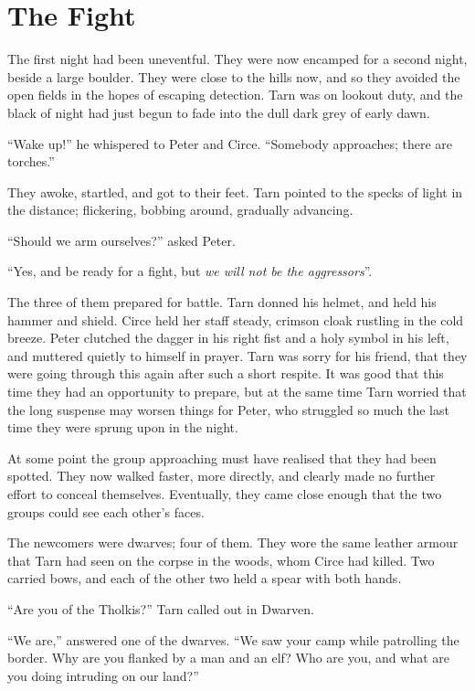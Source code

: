 \chapter{The Fight}

The first night had been uneventful.  They were now encamped for a second night, beside a large boulder.  They were close to the hills now, and so they avoided the open fields in the hopes of escaping detection.  Tarn was on lookout duty, and the black of night had just begun to fade into the dull dark grey of early dawn.

``Wake up!'' he whispered to Peter and Circe.  ``Somebody approaches; there are torches.''

They awoke, startled, and got to their feet.  Tarn pointed to the specks of light in the distance; flickering, bobbing around, gradually advancing.

``Should we arm ourselves?'' asked Peter.

``Yes, and be ready for a fight, but \emph{we will not be the aggressors}''.

The three of them prepared for battle.  Tarn donned his helmet, and held his hammer and shield.  Circe held her staff steady, crimson cloak rustling in the cold breeze.  Peter clutched the dagger in his right fist and a holy symbol in his left, and muttered quietly to himself in prayer.  Tarn was sorry for his friend, that they were going through this again after such a short respite.  It was good that this time they had an opportunity to prepare, but at the same time Tarn worried that the long suspense may worsen things for Peter, who struggled so much the last time they were sprung upon in the night.

At some point the group approaching must have realised that they had been spotted.  They now walked faster, more directly, and clearly made no further effort to conceal themselves.  Eventually, they came close enough that the two groups could see each other's faces.

The newcomers were dwarves; four of them.  They wore the same leather armour that Tarn had seen on the corpse in the woods, whom Circe had killed.  Two carried bows, and each of the other two held a spear with both hands.

``Are you of the Tholkis?'' Tarn called out in Dwarven.

``We are,'' answered one of the dwarves.  ``We saw your camp while patrolling the border.  Why are you flanked by a man and an elf?  Who are you, and what are you doing intruding on our land?''

